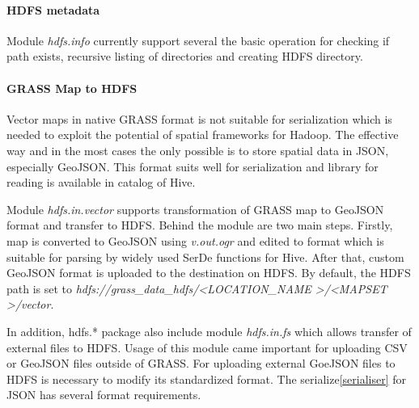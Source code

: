 \documentclass[a4paper,12pt,oneside]{report}
\begin{document}
    \paragraph{HDFS metadata} Module \textit{hdfs.info} currently support several
    the basic operation for checking if path exists, recursive listing of directories and
    creating HDFS directory.
    
    
    \paragraph{GRASS Map to HDFS} Vector maps in native GRASS format is not
    suitable for serialization which is needed to exploit the potential of
    spatial frameworks for Hadoop. The effective way and in the most cases the only
    possible is to store spatial data in JSON, especially GeoJSON. This format suits well  for serialization and library for reading is available in 
    catalog of Hive. 
    
    Module \textit{hdfs.in.vector} supports transformation of GRASS map to
    GeoJSON format and transfer to HDFS. Behind the module are two main steps. Firstly, map is
    converted to GeoJSON using \textit{v.out.ogr} and edited to format which is
    suitable for parsing by widely used SerDe functions for Hive. After that,
    custom GeoJSON format is uploaded to the  destination on HDFS. By default, the
    HDFS path is set to \textit{hdfs://grass\_data\_hdfs/\textless LOCATION\_NAME
    	\textgreater/\textless MAPSET \textgreater /vector}.
    
    In addition, hdfs.* package also include module \textit{hdfs.in.fs} which allows
    transfer of external files to HDFS. Usage of this module came important for
    uploading CSV or GeoJSON files outside of GRASS. For uploading external GoeJSON files to HDFS is
    necessary to modify its standardized format. The serialize\ref{serialiser}  for
    JSON has several format requirements. %
	
\end{document}
